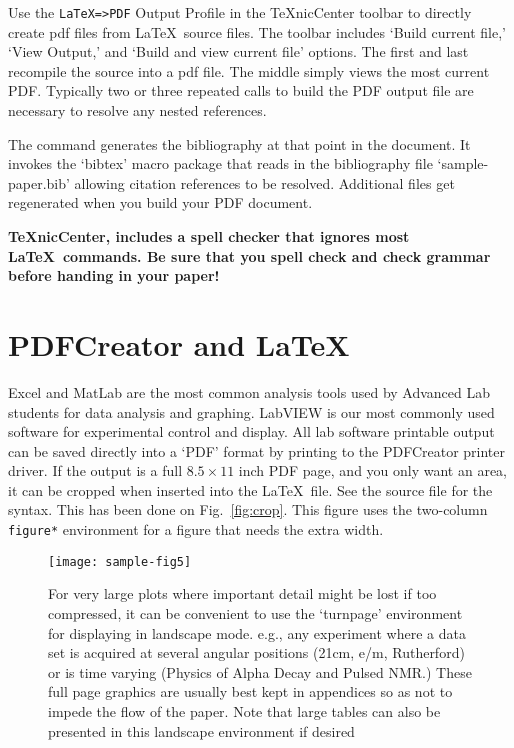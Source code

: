 Use the \verb+LaTeX=>PDF+ Output Profile in the \TeX nicCenter toolbar to directly create pdf files
from \LaTeX\ source files.  The toolbar includes `Build current file,' `View Output,' and
`Build and view current file' options.  The first and last recompile the source
into a pdf file.  The middle simply views the most current PDF\@.
Typically two or three repeated calls to build the PDF output file are necessary to resolve any nested
references.

The \verb++ command
generates the bibliography at that point in the document.
It invokes the `bibtex' macro package that reads in the
bibliography file `sample-paper.bib' allowing citation references to
be resolved.
Additional files get
regenerated when you build your PDF document.

\textbf{\TeX nicCenter, includes a spell checker that ignores most \LaTeX\ 
commands.  Be sure that you spell check and check grammar before handing in your paper!}

\section{PDFCreator and \LaTeX}

Excel and MatLab are the most common analysis tools used by Advanced Lab students
for data analysis and graphing.  LabVIEW is our most commonly used
software for experimental control and display.
All lab software printable output can be saved directly into a `PDF'
format by printing to the PDFCreator printer driver.
If the output is a full $8.5\times 11$ inch PDF page, and you only 
want an area, it can be cropped when inserted into the \LaTeX\ file.
See the source file for the syntax.  This has been done on Fig.~\ref{fig:crop}.
This figure uses the two-column \verb+figure*+ environment for a figure that
needs the extra width.




\begin{turnpage}
\begin{figure*}[p]
\texttt{[image: sample-fig5]}
\caption{For very large plots where important detail might be lost
if too compressed, it can be convenient to use the `turnpage'
environment for displaying in landscape mode. e.g., any experiment
where a data set is acquired at several angular positions (21cm,
e/m, Rutherford) or is time varying (Physics of Alpha Decay and
Pulsed NMR.)  These full page graphics are usually best kept in
appendices so as not to impede the flow of the paper.  Note that
large tables can also be presented in this landscape environment if
desired \label{fig:landscapegraphic}}
\end{figure*}
\end{turnpage}

